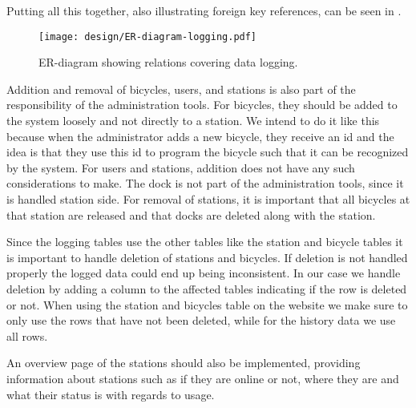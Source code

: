 Putting all this together, also illustrating foreign key references, can be seen in .

\begin{figure}
\texttt{[image: design/ER-diagram-logging.pdf]}
\vspace*{-2cm}
\caption{ER-diagram showing relations covering data logging.}\label{fig:er-dia-log}
\end{figure}

Addition and removal of bicycles, users, and stations is also part of the responsibility of the administration tools. 
For bicycles, they should be added to the system loosely and not directly to a station.
We intend to do it like this because when the administrator adds a new bicycle, they receive an id and the idea is that they use this id to program the bicycle such that it can be recognized by the system.
For users and stations, addition does not have any such considerations to make. 
The dock is not part of the administration tools, since it is handled station side.
For removal of stations, it is important that all bicycles at that station are released and that docks are deleted along with the station.

Since the logging tables use the other tables like the station and bicycle tables it is important to handle deletion of stations and bicycles. 
If deletion is not handled properly the logged data could end up being inconsistent. 
In our case we handle deletion by adding a column to the affected tables indicating if the row is deleted or not. 
When using the station and bicycles table on the website we make sure to only use the rows that have not been deleted, while for the history data we use all rows.

An overview page of the stations should also be implemented, providing information about stations such as if they are online or not, where they are and what their status is with regards to usage.
